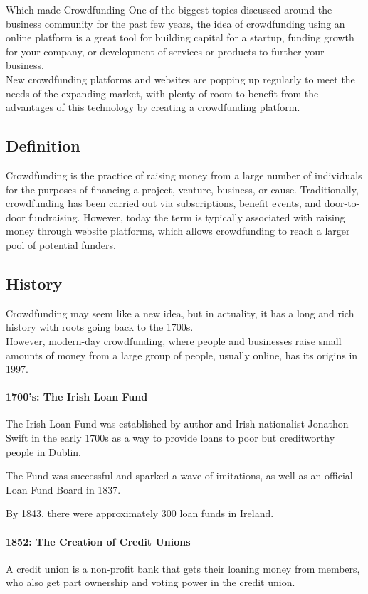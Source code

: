 Which made Crowdfunding One of the biggest topics discussed around the business community for the past few years, the idea of crowdfunding using an online platform is a great tool for building capital for a startup, funding growth for your company, or development of services or products to further your business.\\
New crowdfunding platforms and websites are popping up regularly to meet the needs of the expanding market, with plenty of room to benefit from the advantages of this technology by creating a crowdfunding platform.


\subsection*{Definition}
Crowdfunding is the practice of raising money from a large number of individuals for the purposes of financing a project, venture, business, or cause. Traditionally, crowdfunding has been carried out via subscriptions, benefit events, and door-to-door fundraising. However, today the term is typically associated with raising money through website platforms, which allows crowdfunding to reach a larger pool of potential funders.
\subsection*{History}
Crowdfunding may seem like a new idea, but in actuality, it has a long and rich history with roots going back to the 1700s.\\
However, modern-day crowdfunding, where people and businesses raise small amounts of money from a large group of people, usually online, has its origins in 1997.

\paragraph*{1700’s: The Irish Loan Fund}
The Irish Loan Fund was established by author and Irish nationalist Jonathon Swift in the early 1700s as a way to provide loans to poor but creditworthy people in Dublin.

The Fund was successful and sparked a wave of imitations, as well as an official Loan Fund Board in 1837.

By 1843, there were approximately 300 loan funds in Ireland.

\paragraph*{1852: The Creation of Credit Unions}
A credit union is a non-profit bank that gets their loaning money from members, who also get part ownership and voting power in the credit union.


